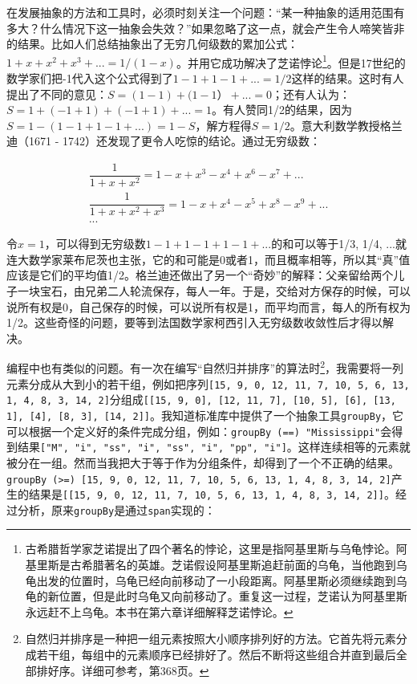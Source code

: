 \documentclass{article}
\begin{document}
在发展抽象的方法和工具时，必须时刻关注一个问题：“某一种抽象的适用范围有多大？什么情况下这一抽象会失效？”如果忽略了这一点，就会产生令人啼笑皆非的结果。比如人们总结抽象出了无穷几何级数的累加公式：$1 + x + x^2 + x^3 + ... = 1/(1-x)$。并用它成功解决了芝诺悖论\footnote{古希腊哲学家芝诺提出了四个著名的悖论，这里是指阿基里斯与乌龟悖论。阿基里斯是古希腊著名的英雄。芝诺假设阿基里斯追赶前面的乌龟，当他跑到乌龟出发的位置时，乌龟已经向前移动了一小段距离。阿基里斯必须继续跑到乌龟的新位置，但是此时乌龟又向前移动了。重复这一过程，芝诺认为阿基里斯永远赶不上乌龟。本书在第六章详细解释芝诺悖论。}。但是17世纪的数学家们把-1代入这个公式得到了$1 - 1 + 1 - 1 + ... = 1/2$这样的结果。这时有人提出了不同的意见：$S = (1 - 1) + (1 - 1）+ ... = 0$；还有人认为：$S = 1 + (-1 + 1) + (-1 + 1) + ... = 1$。有人赞同1/2的结果，因为$S = 1 - (1 - 1 + 1 - 1 + ...) = 1 -S$，解方程得$S = 1/2$。意大利数学教授格兰迪（1671 - 1742）还发现了更令人吃惊的结论。通过无穷级数：

\[
\begin{array}{l}
\dfrac{1}{1 + x + x^2} = 1 - x + x^3 - x^4 + x^6 - x^7 + ... \\[2ex]
\dfrac{1}{1 + x + x^2 + x^3} = 1 - x + x^4 - x^5 + x^8 - x^9 + ... \\
...
\end{array}
\]

令$x = 1$，可以得到无穷级数$1 - 1 + 1 - 1 + 1 - 1 + ...$的和可以等于1/3, 1/4, ...就连大数学家莱布尼茨也主张，它的和可能是0或者1，而且概率相等，所以其“真”值应该是它们的平均值1/2。格兰迪还做出了另一个“奇妙”的解释：父亲留给两个儿子一块宝石，由兄弟二人轮流保存，每人一年。于是，交给对方保存的时候，可以说所有权是0，自己保存的时候，可以说所有权是1，而平均而言，每人的所有权为1/2\cite{HanXueTao16}。这些奇怪的问题，要等到法国数学家柯西引入无穷级数收敛性后才得以解决。

编程中也有类似的问题。有一次在编写“自然归并排序”的算法时\footnote{自然归并排序是一种把一组元素按照大小顺序排列好的方法。它首先将元素分成若干组，每组中的元素顺序已经排好了。然后不断将这些组合并直到最后全部排好序。详细可参考\cite{LiuXinyu2017}，第368页。}，我需要将一列元素分成从大到小的若干组，例如把序列\texttt{[15, 9, 0, 12, 11, 7, 10, 5, 6, 13, 1, 4, 8, 3, 14, 2]}分组成\texttt{[[15, 9, 0], [12, 11, 7], [10, 5], [6], [13, 1], [4], [8, 3], [14, 2]]}。我知道标准库中提供了一个抽象工具\texttt{groupBy}，它可以根据一个定义好的条件完成分组，例如：\texttt{groupBy (==) "Mississippi"}会得到结果\texttt{["M", "i", "ss", "i", "ss", "i", "pp", "i"]}。这样连续相等的元素就被分在一组。然而当我把大于等于作为分组条件，却得到了一个不正确的结果。\texttt{groupBy (>=) [15, 9, 0, 12, 11, 7, 10, 5, 6, 13, 1, 4, 8, 3, 14, 2]}产生的结果是\texttt{[[15, 9, 0, 12, 11, 7, 10, 5, 6, 13, 1, 4, 8, 3, 14, 2]]}。经过分析，原来\texttt{groupBy}是通过\texttt{span}实现的：
\end{document}
